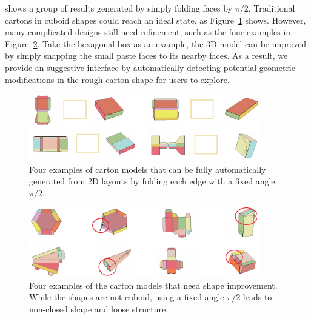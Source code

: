 {\color{blue}{The following two figures}} shows a group of results generated by simply folding faces by $\pi/2$.
Traditional cartons in cuboid shapes could reach an ideal state, as Figure~\ref{fig:initial-automatic} shows.
However, many complicated designs still need refinement, such as the four examples in Figure~\ref{fig:initial-need-improvement}. 
Take the hexagonal box as an example, the 3D model can be improved by simply snapping the small paste faces to its nearby faces. %
%
As a result, we provide an suggestive interface by automatically detecting potential geometric modifications in the rough carton shape for users to explore.

\begin{figure}
	\centering
	\includegraphics[width=0.9\textwidth]{images/initial-auto.png}
	\caption{Four examples of carton models that can be fully automatically generated from 2D layouts by folding each edge with a fixed angle $\pi/2$. }
	\label{fig:initial-automatic}
\end{figure}


\begin{figure}
	\centering
	\includegraphics[width=0.9\textwidth]{images/initial-improve.png}
	\caption{Four examples of the carton models that need shape improvement. While the shapes are not cuboid, using a fixed angle $\pi/2$ leads to non-closed shape and loose structure. }
	\label{fig:initial-need-improvement}
\end{figure}
